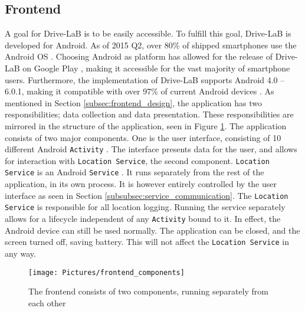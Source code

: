 \subsection{Frontend}\label{subsec:frontend_implementation}
A goal for Drive-LaB is to be easily accessible. To fulfill this goal, Drive-LaB is developed for Android. As of 2015 Q2, over 80\% of shipped smartphones use the Android OS \citep{smartphone_market_share}. Choosing Android as platform has allowed for the release of Drive-LaB on Google Play \citep{google_play_drivelab}, making it accessible for the vast majority of smartphone users. Furthermore, the implementation of Drive-LaB supports Android 4.0 – 6.0.1, making it compatible with over 97\% of current Android devices \citep{android_version_distribution}.
As mentioned in Section \ref{subsec:frontend_design}, the application has two responsibilities; data collection and data presentation. These responsibilities are mirrored in the structure of the application, seen in Figure \ref{fig:frontend_components}. The application consists of two major components. One is the user interface, consisting of 10 different Android \texttt{Activity} \citep{android_activity}. The interface presents data for the user, and allows for interaction with \texttt{Location Service}, the second component. \texttt{Location Service} is an Android \texttt{Service} \citep{android_service}. It runs separately from the rest of the application, in its own process. It is however entirely controlled by the user interface as seen in Section \ref{subsubsec:service_communication}. The \texttt{Location Service} is responsible for all location logging. Running the service separately allows for a lifecycle independent of any \texttt{Activity} bound to it. In effect, the Android device can still be used normally. The application can be closed, and the screen turned off, saving battery. This will not affect the \texttt{Location Service} in any way.

\begin{figure}[tb]
\centering
\texttt{[image: Pictures/frontend\_components]}
\caption{The frontend consists of two components, running separately from each other}
\label{fig:frontend_components}	
\end{figure}

